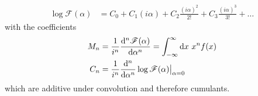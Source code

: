 \documentclass[../jaynes_prob_theory_notes.tex]{subfiles}
\begin{document}
\begin{itemize}
\begin{itemize}
\begin{align*}
                                \log \mathscr{F}(\alpha) &= C_0 + C_{1}(i\alpha) + C_{2}\frac{{(i\alpha)}^2}{2!} + C_{3}\frac{{(i\alpha)}^3}{3!} + \ldots
                            \end{align*}
                            with the coefficients
                            \begin{align*}
                                M_n &= \frac{1}{i^n} \frac{{\deriv}^{n} \mathscr{F}(\alpha)}{{\deriv}{\alpha}^n} = \infint \mathrm{d}x~x^{n}f(x) \\
                                C_n &= \frac{1}{i^n} \frac{{\deriv}^n}{{\deriv}{\alpha}^n} \log \mathscr{F}(\alpha) \at[\big]{\alpha = 0}
                            \end{align*}
                            which are additive under convolution and therefore cumulants.
                    \end{itemize}
            \end{itemize}
\end{document}
